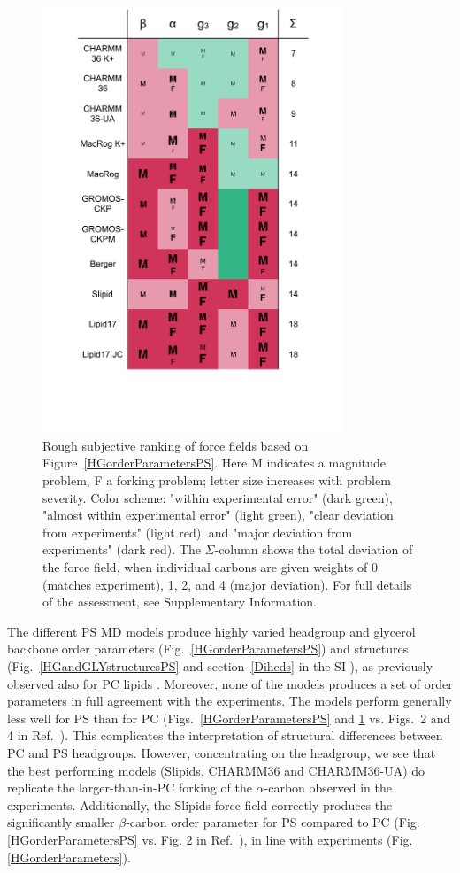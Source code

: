 \documentclass[aps,prl,superscriptaddress,twocolumn]{revtex4}
\begin{document}
\begin{figure}[]
  \centering
  \includegraphics[width=9.0cm]{../Figs/comparisonTablePS.pdf}
  \caption{\label{comparisonTablePS}
    Rough subjective ranking of force fields based on Figure~\ref{HGorderParametersPS}.
    Here {\textsf{\small M}} indicates a magnitude problem, {\textsf{\small F}} a forking problem; letter size increases with problem severity. Color scheme: "within experimental error" (dark green), "almost within experimental error" (light green), "clear deviation from experiments" (light red), and "major deviation from experiments" (dark red). The $\Sigma$-column shows the total deviation of the force field, when individual carbons are given weights of 0 (matches experiment), 1, 2, and 4 (major deviation). For full details of the assessment, see Supplementary Information.
  }
\end{figure}

The different PS MD models produce highly varied  headgroup and glycerol backbone order parameters (Fig.~\ref{HGorderParametersPS})
and structures (Fig.~\ref{HGandGLYstructuresPS} and section~\ref{Diheds} in the SI ),
as previously observed also for PC lipids \cite{botan15}. Moreover, none of the models produces a set of order parameters in full agreement with the experiments.
The models perform generally less well for PS than for PC
(Figs.~\ref{HGorderParametersPS} and \ref{comparisonTablePS} vs. Figs.~2 and 4 in Ref.~\cite{botan15}).
This complicates the interpretation of structural differences between PC and PS headgroups. However, concentrating on the headgroup, we see that the best performing models (Slipids, CHARMM36 and CHARMM36-UA) do replicate the larger-than-in-PC
forking of the $\alpha$-carbon observed in the experiments. Additionally, the Slipids force field correctly produces the significantly smaller $\beta$-carbon order parameter for PS compared to PC (Fig. \ref{HGorderParametersPS} vs. Fig. 2 in Ref.~), in line with
experiments (Fig. \ref{HGorderParameters}).
\end{document}
